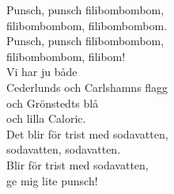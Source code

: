 \documentclass[a6paper, 10pt, twoside]{article}
\begin{document}
\begin{center}
\end{center}
\begin{lyrics}
Punsch, punsch filibombombom,\\
filibombombom, filibombombom.\\
Punsch, punsch filibombombom,\\
filibombombom, filibom!
\vspace{5pt}\\
Vi har ju både \\
Cederlunds och Carlshamns flagg\\
och Grönstedts blå\\
och lilla Caloric.\\
Det blir för trist med sodavatten,\\
sodavatten, sodavatten.\\
Blir för trist med sodavatten,\\
ge mig lite punsch!
\end{lyrics}

\noindent
\end{document}
